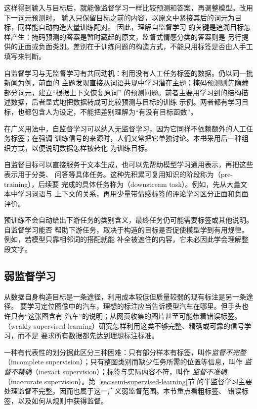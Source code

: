 这样得到输入与目标后，就能像监督学习一样比较预测和答案，再调整模型。改用下一词元预测时，
输入只保留目标之前的内容，以原文中紧接其后的词元为目标，同样能自动构造大量训练配对。
因此，理解自监督学习
的关键是追溯目标怎样产生：掩码预测的答案是暂时藏起的原文，监督式情感分类的答案则是
另行提供的正面或负面类别。差别在于训练问题的构造方式，不能只用标签是否由人手工填写来判断。

自监督学习与无监督学习有共同动机：利用没有人工任务标签的数据。仍以同一批新闻为例，前面的
主题发现直接从词语共现中学习潜在主题；掩码预测则先隐藏部分词元，建立“根据上下文恢复原词”
的预测问题。前者主要用学习到的结构描述数据，后者显式地把数据转成可比较预测与目标的训练
示例。两者都有学习目标，也都包含人为设定，不能把差别理解为“有没有目标函数”。

在广义用法中，自监督学习可以纳入无监督学习，因为它同样不依赖额外的人工任务标签；在强调
训练信号的来源时，人们又常把它单独讨论。本书采用后一种组织方式，以便说明数据怎样被转化
为训练目标。

自监督目标可以直接服务于文本生成，也可以先帮助模型学习通用表示，再把这些表示用于分类、
问答等具体任务。这种先积累可复用知识的阶段称为（pre-training），后续要
完成的具体任务称为（downstream task）。例如，先从大量文本中学习词语与
上下文的关系，再用少量带情感标签的评论学习区分正面和负面评价。

预训练不会自动给出下游任务的类别含义，最终任务仍可能需要标签或其他说明。自监督学习能否
帮助下游任务，取决于构造的目标是否促使模型学到有用规律。例如，若模型只靠相邻词的搭配就能
补全被遮住的内容，它未必因此学会理解整段文字。

\subsection{弱监督学习}
\label{sec:weakly-supervised-learning}

从数据自身构造目标是一条途径，利用成本较低但质量较弱的现有标注是另一条途径。
要学习定位图像中的汽车，理想的标注应当告诉模型汽车在哪里。但手头也许只有“这张图含有
汽车”的说明；从网页收集的图片甚至可能带着错误标签。
（weakly supervised learning）研究怎样利用这类不够完整、精确或可靠的信号学习，而不是
要求所有数据都先达到理想标注标准。

一种有代表性的划分据此区分三种困难：只有部分样本有标签，叫作\emph{监督不完整}
（incomplete supervision）；只有整图类别而缺少任务所需的位置等信息，叫作
\emph{监督不精确}（inexact supervision）；标签与实际内容不符，叫作
\emph{监督不准确}（inaccurate supervision）。第~\ref{sec:semi-supervised-learning}节
的半监督学习主要处理监督不完整，因而也属于这一广义弱监督范围。本节重点看粗标签、
错误标签，以及如何从规则中获得监督。

